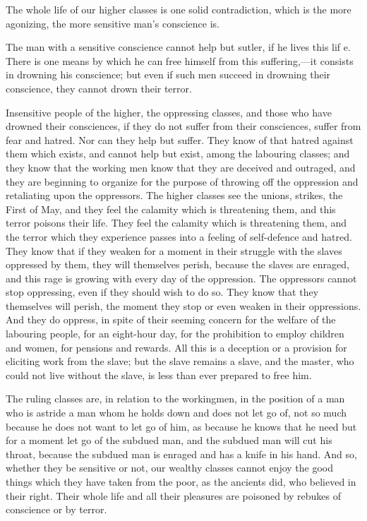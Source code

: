 \documentclass{book}
\begin{document}
The whole life of our higher classes is one solid contradiction, which is the more agonizing, the more sensitive man’s conscience is.

The man with a sensitive conscience cannot help but sutler, if he lives this lif e. There is one means by which he can free himself from this suffering,—it consists in drowning his conscience; but even if such men succeed in drowning their conscience, they cannot drown their terror.

Insensitive people of the higher, the oppressing classes, and those who have drowned their consciences, if they do not suffer from their consciences, suffer from fear and hatred. Nor can they help but suffer. They know of that hatred against them which exists, and cannot help but exist, among the labouring classes; and they know that the working men know that they are deceived and outraged, and they are beginning to organize for the purpose of throwing off the oppression and retaliating upon the oppressors. The higher classes see the unions, strikes, the First of May, and they feel the calamity which is threatening them, and this terror poisons their life. They feel the calamity which is threatening them, and the terror which they experience passes into a feeling of self-defence and hatred. They know that if they weaken for a moment in their struggle with the slaves oppressed by them, they will themselves perish, because the slaves are enraged, and this rage is growing with every day of the oppression. The oppressors cannot stop oppressing, even if they should wish to do so. They know that they themselves will perish, the moment they stop or even weaken in their oppressions. And they do oppress, in spite of their seeming concern for the welfare of the labouring people, for an eight-hour day, for the prohibition to employ children and women, for pensions and rewards. All this is a deception or a provision for eliciting work from the slave; but the slave remains a slave, and the master, who could not live without the slave, is less than ever prepared to free him.

The ruling classes are, in relation to the workingmen, in the position of a man who is astride a man whom he holds down and does not let go of, not so much because he does not want to let go of him, as because he knows that he need but for a moment let go of the subdued man, and the subdued man will cut his throat, because the subdued man is enraged and has a knife in his hand. And so, whether they be sensitive or not, our wealthy classes cannot enjoy the good things which they have taken from the poor, as the ancients did, who believed in their right. Their whole life and all their pleasures are poisoned by rebukes of conscience or by terror.
\end{document}
